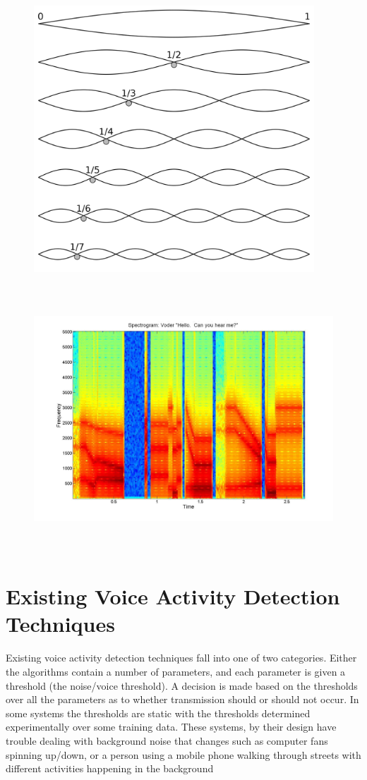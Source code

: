 \documentclass[ %
                    author={Sam Phippen},
                supervisor={Dr. Rafal Bogacz},
                     title={Real time voice activity detectors in noisy personal computing environments},
                  subtitle={},
                    degree={MEng},
                      year={2012} ]{thesis}
\begin{document}
\begin{figure}
    \includegraphics[height=10cm]{harmonics.png}
    \label{img:harmonics}
\end{figure}

\begin{figure}
    \includegraphics[height=10cm]{voder_spectrogram.jpg}
    \label{img:spectrogram}
\end{figure}

\section{Existing Voice Activity Detection Techniques}

Existing voice activity detection techniques fall into one of two categories.
Either the algorithms contain a number of parameters, and each parameter is
given a threshold (the noise/voice threshold). A decision is made based on the
thresholds over all the parameters as to whether transmission should or should
not occur. In some systems the thresholds are static with the thresholds
determined experimentally over some training data\cite{haigh}. These systems,
by their design have trouble dealing with background noise that changes such as
computer fans spinning up/down, or a person using a mobile phone walking through
streets with different activities happening in the background
\end{document}
